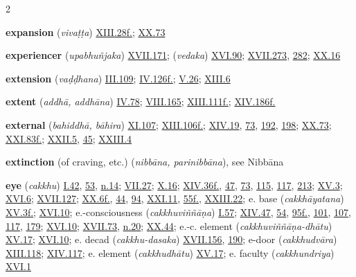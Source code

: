 \begin{multicols}{2}
\begin{vismHanging}
\par\textbf{expansion} (\emph{vivaṭṭa}) \hyperlink{XIII.28}{XIII.28f.}{}; \hyperlink{XX.73}{XX.73}{}
\par\textbf{experiencer} (\emph{upabhuñjaka}) \hyperlink{XVII.171}{XVII.171}{}; (\emph{vedaka}) \hyperlink{XVI.90}{XVI.90}{}; \hyperlink{XVII.273}{XVII.273}{}, \hyperlink{XVII.282}{282}{}; \hyperlink{XX.16}{XX.16}{}
\par\textbf{extension} (\emph{vaḍḍhana}) \hyperlink{III.109}{III.109}{}; \hyperlink{IV.126}{IV.126f.}{}; \hyperlink{V.26}{V.26}{}; \hyperlink{XIII.6}{XIII.6}{}
\par\textbf{extent} (\emph{addhā, addhāna}) \hyperlink{IV.78}{IV.78}{}; \hyperlink{VIII.165}{VIII.165}{}; \hyperlink{XIII.111}{XIII.111f.}{}; \hyperlink{XIV.186}{XIV.186f.}{}
\par\textbf{external} (\emph{bahiddhā, bāhira}) \hyperlink{XI.107}{XI.107}{}; \hyperlink{XIII.106}{XIII.106f.}{}; \hyperlink{XIV.19}{XIV.19}{}, \hyperlink{XIV.73}{73}{}, \hyperlink{XIV.192}{192}{}, \hyperlink{XIV.198}{198}{}; \hyperlink{XX.73}{XX.73}{}; \hyperlink{XXI.83}{XXI.83f.}{}; \hyperlink{XXII.5}{XXII.5}{}, \hyperlink{XXII.45}{45}{}; \hyperlink{XXIII.4}{XXIII.4}{}
\par\textbf{extinction} (of craving, etc.) (\emph{nibbāna, parinibbāna}), see Nibbāna 
\par\textbf{eye} (\emph{cakkhu}) \hyperlink{I.42}{I.42}{}, \hyperlink{I.53}{53}{}, \hyperlink{I.n14}{n.14}{}; \hyperlink{VII.27}{VII.27}{}; \hyperlink{X.16}{X.16}{}; \hyperlink{XIV.36}{XIV.36f.}{}, \hyperlink{XIV.47}{47}{}, \hyperlink{XIV.73}{73}{}, \hyperlink{XIV.115}{115}{}, \hyperlink{XIV.117}{117}{}, \hyperlink{XIV.213}{213}{}; \hyperlink{XV.3}{XV.3}{}; \hyperlink{XVI.6}{XVI.6}{}; \hyperlink{XVII.127}{XVII.127}{}; \hyperlink{XX.6}{XX.6f.}{}, \hyperlink{XX.44}{44}{}, \hyperlink{XX.94}{94}{}, \hyperlink{XXI.11}{XXI.11}{}, \hyperlink{XXI.55}{55f.}{}, \hyperlink{XXIII.22}{XXIII.22}{}; e. base (\emph{cakkhāyatana}) \hyperlink{XV.3}{XV.3f.}{}; \hyperlink{XVI.10}{XVI.10}{}; e.-consciousness (\emph{cakkhuviññāṇa}) \hyperlink{I.57}{I.57}{}; \hyperlink{XIV.47}{XIV.47}{}, \hyperlink{XIV.54}{54}{}, \hyperlink{XIV.95}{95f.}{}, \hyperlink{XIV.101}{101}{}, \hyperlink{XIV.107}{107}{}, \hyperlink{XIV.117}{117}{}, \hyperlink{XIV.179}{179}{}; \hyperlink{XVI.10}{XVI.10}{}; \hyperlink{XVII.73}{XVII.73}{}, \hyperlink{XVII.n20}{n.20}{}; \hyperlink{XX.44}{XX.44}{}; e.-c. element (\emph{cakkhuviññāṇa-dhātu}) \hyperlink{XV.17}{XV.17}{}; \hyperlink{XVI.10}{XVI.10}{}; e. decad (\emph{cakkhu-dasaka}) \hyperlink{XVII.156}{XVII.156}{}, \hyperlink{XVII.190}{190}{}; e-door (\emph{cakkhudvāra}) \hyperlink{XIII.118}{XIII.118}{}; \hyperlink{XIV.117}{XIV.117}{}; e. element (\emph{cakkhudhātu}) \hyperlink{XV.17}{XV.17}{}; e. faculty (\emph{cakkhundriya}) \hyperlink{XVI.1}{XVI.1}{}

\end{vismHanging}
\end{multicols}
